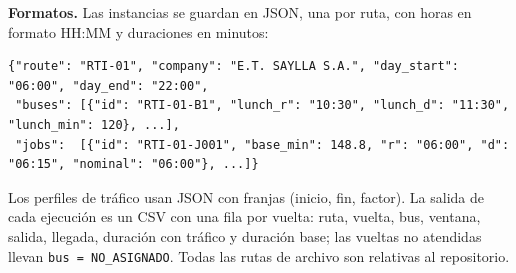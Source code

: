 \textbf{Formatos.} Las instancias se guardan en JSON, una por ruta, con horas en formato HH:MM y duraciones en minutos:
\begin{lstlisting}
{"route": "RTI-01", "company": "E.T. SAYLLA S.A.", "day_start": "06:00", "day_end": "22:00",
 "buses": [{"id": "RTI-01-B1", "lunch_r": "10:30", "lunch_d": "11:30", "lunch_min": 120}, ...],
 "jobs":  [{"id": "RTI-01-J001", "base_min": 148.8, "r": "06:00", "d": "06:15", "nominal": "06:00"}, ...]}
\end{lstlisting}
Los perfiles de tráfico usan JSON con franjas (inicio, fin, factor). La salida de cada ejecución es un CSV con una fila por vuelta: ruta, vuelta, bus, ventana, salida, llegada, duración con tráfico y duración base; las vueltas no atendidas llevan \texttt{bus = NO\_ASIGNADO}. Todas las rutas de archivo son relativas al repositorio.
